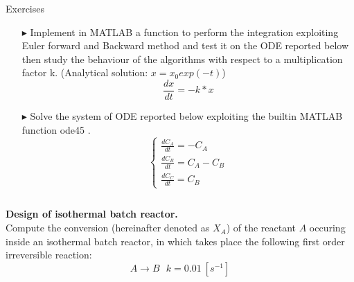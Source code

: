 \documentclass[xcolor={dvipsnames,rgb}, aspectratio=169]{beamer}
\begin{document}
\begin{frame}{Exercises}
   \begin{itemize}
      \item[$\blacktriangleright$] Implement in MATLAB a function to perform the
         integration exploiting Euler forward and Backward method and test it on the ODE
         reported below then study the behaviour of the algorithms with respect to a
         multiplication factor k. (Analytical solution: $x = x_{0}exp(-t)$)
         \begin{equation*}
            \frac{dx}{dt} = -k * x
         \end{equation*}

      \item[$\blacktriangleright$] Solve the system of ODE reported below exploiting the
         builtin MATLAB function \color{blue} ode45 \color{black}.
         \begin{equation*}
            \begin{cases}
               \frac{dC_{A}}{dt} = -C_{A} \\
               \frac{dC_{B}}{dt} = C_{A} - C_{B} \\
               \frac{dC_{C}}{dt} = C_{B}
            \end{cases}
         \end{equation*}
   \end{itemize}
\end{frame}

\begin{frame}{}
   \begin{columns}[T]
      \textbf{Design of isothermal batch reactor.} \\
      Compute the conversion (hereinafter denoted as $X_{A}$) of the reactant $A$
      occuring inside an isothermal batch reactor, in which takes place the following
      first order irreversible reaction:
      \begin{equation*}
         A \rightarrow B \: \: \: k = 0.01 \: \left[s^{-1}\right]
      \end{equation*}
   \end{columns}
\end{frame}
\end{document}
